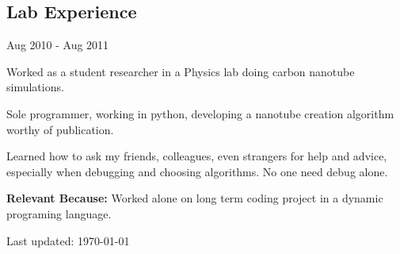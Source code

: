 \documentclass[10pt,letterpaper]{article}
\renewenvironment{itemize}{
  \begin{list}{}{
    \setlength{\leftmargin}{1.5em}
    \setlength{\itemsep}{0.25em}
    \setlength{\parskip}{0pt}
    \setlength{\parsep}{0.25em}
  }
}{
  \end{list}
}
\begin{document}
\subsection*{Lab Experience}
\begin{itemize}

    \item Aug 2010 - Aug 2011
    \item Worked as a student researcher in a Physics lab doing carbon nanotube simulations.
    \item Sole programmer, working in python, developing a nanotube creation algorithm worthy of publication.
    \item Learned how to ask my friends, colleagues, even strangers for help and advice, especially when debugging and choosing algorithms. No one need debug alone.
    \item \textbf{Relevant Because:} Worked alone on long term coding project in a dynamic programing language.

\end{itemize}


\bigskip

\begin{center}
  \begin{small}
    Last updated: \today
  \end{small}
\end{center}
\end{document}
